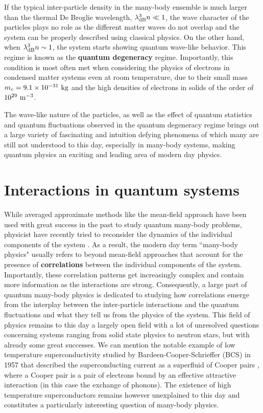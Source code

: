 \noindent If the typical inter-particle density in the many-body ensemble is much larger than the thermal De Broglie wavelength, \ie $\lambda_{\rm{dB}}^3 n \ll 1$, the wave character of the particles plays no role as the different matter waves do not overlap and the system can be properly described using classical physics. On the other hand, when $\lambda_{\rm{dB}}^3 n \sim 1$, the system starts showing quantum wave-like behavior. This regime is known as the \textbf{quantum degeneracy} regime. Importantly, this condition is most often met when considering the physics of electrons in condensed matter systems even at room temperature, due to their small mass $m_e = 9.1 \times 10^{-31} \ \rm{kg}$ and the high densities of electrons in solids of the order of $10^{29} \ \rm{m}^{-3}$.

The wave-like nature of the particles, as well as the effect of quantum statistics and quantum fluctuations observed in the quantum degeneracy regime brings out a large variety of fascinating and intuition defying phenomena of which many are still not understood to this day, especially in many-body systems, making quantum physics an exciting and leading area of modern day physics.

\section*{Interactions in quantum systems}

While averaged approximate methods like the mean-field approach have been used with great success in the past to study quantum many-body problems, physicist have recently tried to reconsider the dynamics of the individual components of the system \cite{lavoine2021,papp2008bragg,schweigler2017experimental,wenz2013few}. As a result, the modern day term ``many-body physics" usually refers to beyond mean-field approaches that account for the presence of \textbf{correlations} between the individual components of the system. Importantly, these correlation patterns get increasingly complex and contain more information as the interactions are strong. Consequently, a large part of quantum many-body physics is dedicated to studying how correlations emerge from the interplay between the inter-particle interactions and the quantum fluctuations and what they tell us from the physics of the system. This field of physics remains to this day a largely open field with a lot of unresolved questions concerning systems ranging from solid state physics to neutron stars, but with already some great successes. We can mention the notable example of low temperature superconductivity studied by Bardeen-Cooper-Schrieffer \cite{bardeen1957theory} (BCS) in 1957 that described the superconducting current as a superfluid of Cooper pairs \cite{cooper1956bound}, where a Cooper pair is a pair of electrons bound by an effective attractive interaction (in this case the exchange of phonons). The existence of high temperature superconductors remains however unexplained to this day and constitutes a particularly interesting question of many-body physics.

